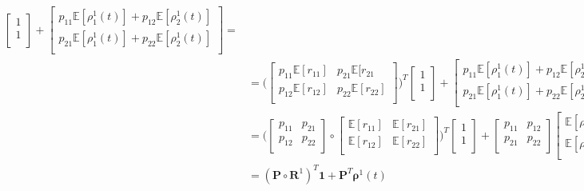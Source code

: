 \documentclass[\main/main.tex]{subfiles}
\begin{document}
\begin{equation}
\begin{split}
  \begin{bmatrix}
 1\\
 1\\
 \end{bmatrix}
 + 
 \begin{bmatrix} 
 p_{11}\mathds{E}[\rho_1^1(t)] + p_{12}\mathds{E}[\rho_2^1(t)] \\
 p_{21}\mathds{E}[\rho_1^1(t)] + 
 p_{22}\mathds{E}[\rho_2^1(t)]\\
 \end{bmatrix} =\\
 &= \Bigg( \begin{bmatrix} 
 p_{11}\mathds{E}[r_{11}] & p_{21}\mathds{E}[r_{21}\\
 p_{12}\mathds{E}[r_{12}]&  p_{22} \mathds{E}[r_{22}]\\
 \end{bmatrix}
  \Bigg) ^T
  \begin{bmatrix}
 1\\
 1\\
 \end{bmatrix}
 + 
 \begin{bmatrix} 
 p_{11}\mathds{E}[\rho_1^1(t)] + p_{12}\mathds{E}[\rho_2^1(t)] \\
 p_{21}\mathds{E}[\rho_1^1(t)] + 
 p_{22}\mathds{E}[\rho_2^1(t)]\\
 \end{bmatrix} =\\
 &= \Bigg(
\begin{bmatrix} 
 p_{11}& p_{21}\\
 p_{12}& p_{22}\\
 \end{bmatrix} \circ
 \begin{bmatrix} 
 \mathds{E}[r_{11}] &  \mathds{E}[r_{21}] \\
 \mathds{E}[r_{12}] &  \mathds{E}[r_{22}] \\
 \end{bmatrix}
 \Bigg) ^T
 \begin{bmatrix}
 1\\
 1\\
 \end{bmatrix}
 + 
 \begin{bmatrix} 
 p_{11}& p_{12}\\
 p_{21}& p_{22}\\
 \end{bmatrix}
 \begin{bmatrix}
      \mathds{E}[\rho_1^1(t)]\\
      \mathds{E}[\rho_2^1(t)]\\
\end{bmatrix}= \\
&= (\mathbf{P} \circ \mathbf{R}^1)^T \mathbf{1} + \mathbf{P}^T \bm{\rho}^1(t) \\
\end{split}
\end{equation}
\end{document}
